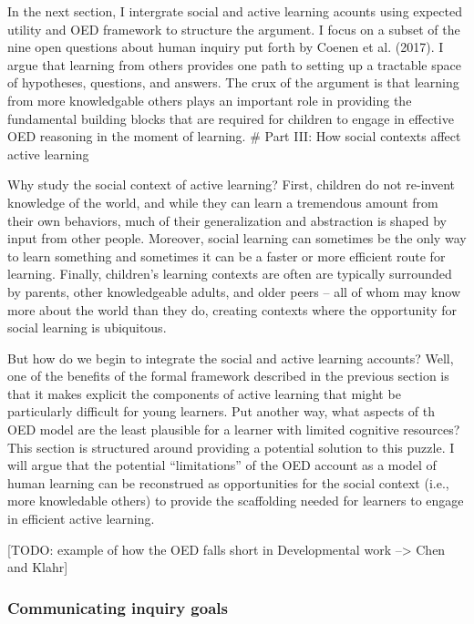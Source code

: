 \documentclass[a4paper,man,apacite,floatsintext]{apa6}
\begin{document}
In the next section, I intergrate social and active learning acounts
using expected utility and OED framework to structure the argument. I
focus on a subset of the nine open questions about human inquiry put
forth by Coenen et al. (2017). I argue that learning from others
provides one path to setting up a tractable space of hypotheses,
questions, and answers. The crux of the argument is that learning from
more knowledgable others plays an important role in providing the
fundamental building blocks that are required for children to engage in
effective OED reasoning in the moment of learning. \# Part III: How
social contexts affect active learning

Why study the social context of active learning? First, children do not
re-invent knowledge of the world, and while they can learn a tremendous
amount from their own behaviors, much of their generalization and
abstraction is shaped by input from other people. Moreover, social
learning can sometimes be the only way to learn something and sometimes
it can be a faster or more efficient route for learning. Finally,
children's learning contexts are often are typically surrounded by
parents, other knowledgeable adults, and older peers -- all of whom may
know more about the world than they do, creating contexts where the
opportunity for social learning is ubiquitous.

But how do we begin to integrate the social and active learning
accounts? Well, one of the benefits of the formal framework described in
the previous section is that it makes explicit the components of active
learning that might be particularly difficult for young learners. Put
another way, what aspects of th OED model are the least plausible for a
learner with limited cognitive resources? This section is structured
around providing a potential solution to this puzzle. I will argue that
the potential ``limitations'' of the OED account as a model of human
learning can be reconstrued as opportunities for the social context
(i.e., more knowledable others) to provide the scaffolding needed for
learners to engage in efficient active learning.

{[}TODO: example of how the OED falls short in Developmental work
--\textgreater{} Chen and Klahr{]}

\subsubsection{Communicating inquiry
goals}\label{communicating-inquiry-goals}
\end{document}
